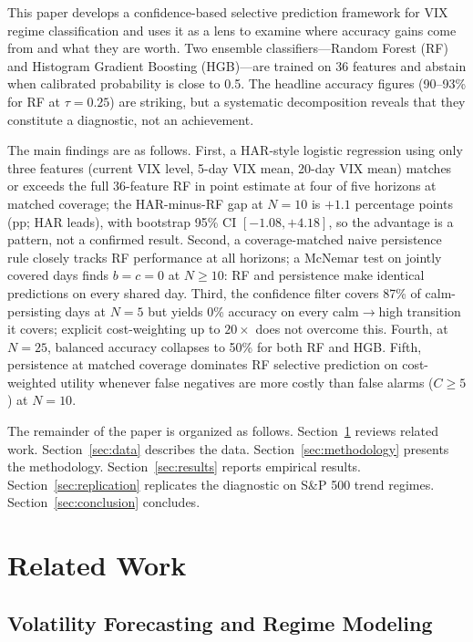 \documentclass[12pt]{article}
\begin{document}
This paper develops a confidence-based selective prediction framework for VIX regime
classification and uses it as a lens to examine where accuracy gains come from and what they are
worth. Two ensemble classifiers---Random Forest (RF) and Histogram Gradient Boosting (HGB)---are
trained on 36 features and abstain when calibrated probability is close to 0.5. The headline
accuracy figures (90--93\% for RF at $\tau = 0.25$) are striking, but a systematic decomposition
reveals that they constitute a diagnostic, not an achievement.

The main findings are as follows. First, a HAR-style logistic regression using only three
features (current VIX level, 5-day VIX mean, 20-day VIX mean) matches or exceeds the full
36-feature RF in point estimate at four of five horizons at matched coverage; the HAR-minus-RF
gap at $N = 10$ is $+1.1$ percentage points (pp; HAR leads), with bootstrap 95\% CI
$[-1.08, +4.18]$, so the advantage is a pattern, not a confirmed result. Second, a
coverage-matched naive persistence rule closely tracks RF performance at all horizons; a McNemar
test on jointly covered days finds $b = c = 0$ at $N \geq 10$: RF and persistence make identical
predictions on every shared day. Third, the confidence filter covers 87\% of calm-persisting days
at $N = 5$ but yields 0\% accuracy on every calm$\to$high transition it covers; explicit
cost-weighting up to $20{\times}$ does not overcome this. Fourth, at $N = 25$, balanced accuracy
collapses to 50\% for both RF and HGB. Fifth, persistence at matched coverage dominates RF
selective prediction on cost-weighted utility whenever false negatives are more costly than false
alarms ($C \geq 5$) at $N = 10$.

The remainder of the paper is organized as follows. Section~\ref{sec:related} reviews related
work. Section~\ref{sec:data} describes the data. Section~\ref{sec:methodology} presents the
methodology. Section~\ref{sec:results} reports empirical results. Section~\ref{sec:replication}
replicates the diagnostic on S\&P 500 trend regimes. Section~\ref{sec:conclusion} concludes.

\section{Related Work}
\label{sec:related}

\subsection{Volatility Forecasting and Regime Modeling}
\end{document}
